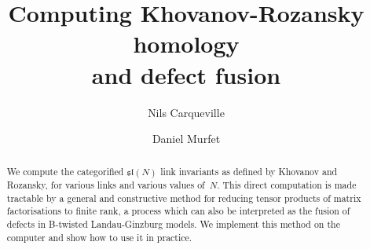 \documentclass{compositio}
\theoremstyle{definition}
\numberwithin{equation}{section}
\def\res{\operatorname{Res}}
\begin{document}
\def\Res{\res\!}
\newcommand{\cat}[1]{\mathcal{#1}}
\newcommand{\lto}{\longrightarrow}
\newcommand{\xlto}[1]{\stackrel{#1}\lto}
\newcommand{\mf}[1]{\mathfrak{#1}}
\newcommand{\md}[1]{\mathscr{#1}}
\newcommand{\intvar}{\bs{x}_{\textup{int}}}
\newcommand{\extvar}{\bs{x}_{\textup{ext}}}
\newcommand{\qderu}[2]{\mathbf{D}^{#1}(#2)}
\newcommand{\ud}{\mathrm{d}}
\def\l{\,|\,}
\def\cf{\boldsymbol{cf}}
\def\bx{\boldsymbol{x}}
\def\by{\boldsymbol{y}}
\def\ba{\boldsymbol{a}}
\def\bb{\boldsymbol{b}}
\def\totimes{\otimes}
\def\di{Q}
\newcommand{\cotimes}[1]{\,\widehat{\otimes}_{#1}\,}
\def\QQ{\mathds{Q}}
\def\krc{C}
\def\diffm{d}
\def\diffh{d_{\chi}}
\def\redh{\overline{H}}
\def\ZZ{\mathds{Z}}
\def\bs{\boldsymbol}
\def\Ztwo{\mathds{Z}_2}
\def\mdual{^{\vee}}
\def\KR{\operatorname{KR}}
\def\I{\!\operatorname{i}\!}
\def\E{\operatorname{e}\!}
\def\sln{\mathfrak{sl}(N)}
\def\nN{\mathds{N}}
\def\nZ{\mathds{Z}}
\def\nQ{\mathds{Q}}
\def\nR{\mathds{R}}
\def\nC{\mathds{C}}
\def\idem{\epsilon}
\def\Xcirc{%
\begin{tikzpicture}[inner sep=0mm]
\node (X) at (0,0) {$X$};
\node (0) at (0,0) [circle,inner sep=0.99pt, thin,draw=black,fill= white] {};
\end{tikzpicture}%
}
\def\Xbul{%
\begin{tikzpicture}[inner sep=0mm]
\node (X) at (0,0) {$X$};
\node (0) at (0,0) [circle,inner sep=0.99pt, thin,draw=black,fill= black] {};
\end{tikzpicture}%
}

\title{Computing Khovanov-Rozansky homology \\ and defect fusion}
\author{Nils Carqueville}
\address{Arnold Sommerfeld Center for Theoretical Physics, LMU M\"unchen \& Excellence Cluster Universe}

\author{Daniel Murfet}
\address{Department of Mathematics, UCLA}


\begin{abstract}
We compute the categorified $\sln$ link invariants as defined by Khovanov and Rozansky, for various links and various values of~$N$. This direct computation is made tractable by a general and constructive method for reducing tensor products of matrix factorisations to finite rank, a process which can also be interpreted as the fusion of defects in B-twisted Landau-Ginzburg models. We implement this method on the computer and show how to use it in practice. 
\end{abstract}
\end{document}
